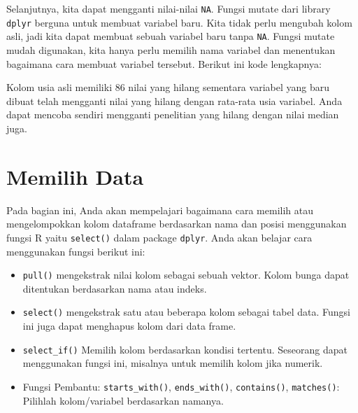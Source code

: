 \documentclass[
]{book}
\newenvironment{Shaded}{\begin{snugshade}}{\end{snugshade}}
\newcommand{\DataTypeTok}[1]{\textcolor[rgb]{0.13,0.29,0.53}{#1}}
\newcommand{\DecValTok}[1]{\textcolor[rgb]{0.00,0.00,0.81}{#1}}
\newcommand{\KeywordTok}[1]{\textcolor[rgb]{0.13,0.29,0.53}{\textbf{#1}}}
\newcommand{\NormalTok}[1]{#1}
\newcommand{\OperatorTok}[1]{\textcolor[rgb]{0.81,0.36,0.00}{\textbf{#1}}}
\newcommand{\StringTok}[1]{\textcolor[rgb]{0.31,0.60,0.02}{#1}}
\providecommand{\tightlist}{%
  \setlength{\itemsep}{0pt}\setlength{\parskip}{0pt}}
\begin{document}
Selanjutnya, kita dapat mengganti nilai-nilai \texttt{NA}. Fungsi mutate dari library \texttt{dplyr} berguna untuk membuat variabel baru. Kita tidak perlu mengubah kolom asli, jadi kita dapat membuat sebuah variabel baru tanpa \texttt{NA}. Fungsi mutate mudah digunakan, kita hanya perlu memilih nama variabel dan menentukan bagaimana cara membuat variabel tersebut. Berikut ini kode lengkapnya:

\begin{Shaded}
\end{Shaded}

Kolom usia asli memiliki 86 nilai yang hilang sementara variabel yang baru dibuat telah mengganti nilai yang hilang dengan rata-rata usia variabel. Anda dapat mencoba sendiri mengganti penelitian yang hilang dengan nilai median juga.

\hypertarget{memilih-data}{%
\section{Memilih Data}\label{memilih-data}}

Pada bagian ini, Anda akan mempelajari bagaimana cara memilih atau mengelompokkan kolom dataframe berdasarkan nama dan posisi menggunakan fungsi R yaitu \texttt{select()} dalam package \texttt{dplyr}. Anda akan belajar cara menggunakan fungsi berikut ini:

\begin{itemize}
\tightlist
\item
  \texttt{pull()} mengekstrak nilai kolom sebagai sebuah vektor. Kolom bunga dapat ditentukan berdasarkan nama atau indeks.
\item
  \texttt{select()} mengekstrak satu atau beberapa kolom sebagai tabel data. Fungsi ini juga dapat menghapus kolom dari data frame.
\item
  \texttt{select\_if()} Memilih kolom berdasarkan kondisi tertentu. Seseorang dapat menggunakan fungsi ini, misalnya untuk memilih kolom jika numerik.
\item
  Fungsi Pembantu: \texttt{starts\_with()}, \texttt{ends\_with()}, \texttt{contains()}, \texttt{matches()}: Pilihlah kolom/variabel berdasarkan namanya.
\end{itemize}
\end{document}
